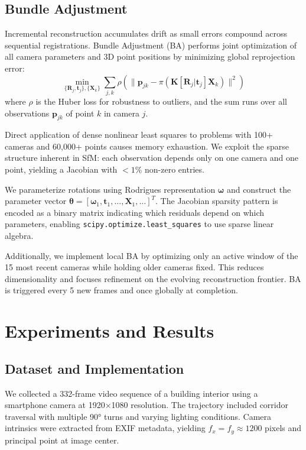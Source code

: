 \documentclass[10pt,twocolumn,letterpaper]{article}
\begin{document}
\subsection{Bundle Adjustment}

Incremental reconstruction accumulates drift as small errors compound across sequential registrations. Bundle Adjustment (BA) performs joint optimization of all camera parameters and 3D point positions by minimizing global reprojection error:
\begin{equation}
\min_{\{\mathbf{R}_j, \mathbf{t}_j\}, \{\mathbf{X}_k\}} \sum_{j,k} \rho\left(\| \mathbf{p}_{jk} - \pi(\mathbf{K}[\mathbf{R}_j|\mathbf{t}_j]\mathbf{X}_k) \|^2\right)
\end{equation}
where $\rho$ is the Huber loss for robustness to outliers, and the sum runs over all observations $\mathbf{p}_{jk}$ of point $k$ in camera $j$.

Direct application of dense nonlinear least squares to problems with 100+ cameras and 60,000+ points causes memory exhaustion. We exploit the sparse structure inherent in SfM: each observation depends only on one camera and one point, yielding a Jacobian with $<1\%$ non-zero entries.

We parameterize rotations using Rodrigues representation $\boldsymbol{\omega}$ and construct the parameter vector $\boldsymbol{\theta} = [\boldsymbol{\omega}_1, \mathbf{t}_1, \ldots, \mathbf{X}_1, \ldots]^T$. The Jacobian sparsity pattern is encoded as a binary matrix indicating which residuals depend on which parameters, enabling \texttt{scipy.optimize.least\_squares} to use sparse linear algebra.

Additionally, we implement local BA by optimizing only an active window of the 15 most recent cameras while holding older cameras fixed. This reduces dimensionality and focuses refinement on the evolving reconstruction frontier. BA is triggered every 5 new frames and once globally at completion.

\section{Experiments and Results}

\subsection{Dataset and Implementation}

We collected a 332-frame video sequence of a building interior using a smartphone camera at 1920×1080 resolution. The trajectory included corridor traversal with multiple 90° turns and varying lighting conditions. Camera intrinsics were extracted from EXIF metadata, yielding $f_x = f_y \approx 1200$ pixels and principal point at image center.
\end{document}
